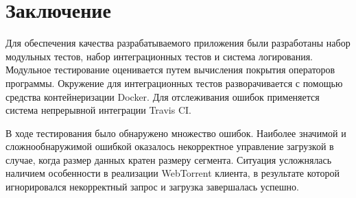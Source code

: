 \documentclass[a4paper,14pt]{extarticle}
\begin{document}
\section*{Заключение}

Для обеспечения качества разрабатываемого приложения были разработаны набор 
модульных тестов, набор интеграционных тестов и система логирования. Модульное 
тестирование оценивается путем вычисления покрытия операторов программы. 
Окружение для интеграционных тестов разворачивается с помощью средства 
контейнеризации Docker. Для отслеживания ошибок применяется система непрерывной 
интеграции Travis CI. 

В ходе тестирования было обнаружено множество ошибок. Наиболее значимой и 
сложнообнаружимой ошибкой оказалось некорректное управление загрузкой в случае, 
когда размер данных кратен размеру сегмента. Ситуация усложнялась наличием 
особенности в реализации WebTorrent клиента, в результате которой игнорировался 
некорректный запрос и загрузка завершалась успешно.
\end{document}
